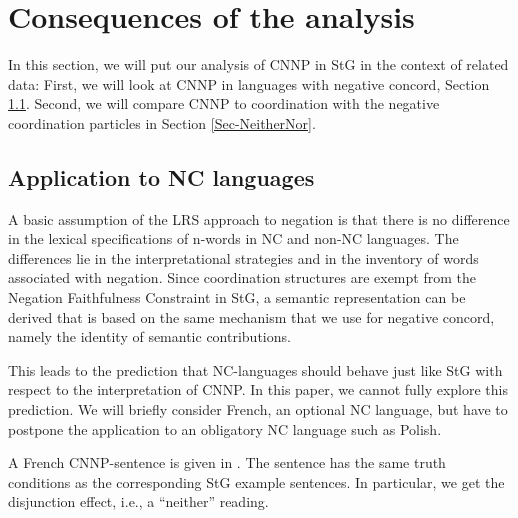 \documentclass[output=paper]{langsci/langscibook}
\begin{document}

\section{Consequences of the analysis}
\label{Sec-Analysis-Consequences}

In this section, we will put our analysis of CNNP in StG in the context of related data: First, we will look at CNNP in languages with negative concord, Section \ref{Sec-AnalysisOhterLang}. Second, we will compare CNNP to coordination with the negative coordination particles  in Section \ref{Sec-NeitherNor}.

\subsection{Application to NC languages}
\label{Sec-AnalysisOhterLang}



A basic assumption of the LRS approach to negation is that there is no difference in the lexical specifications of n-words in NC and non-NC languages. 
The differences lie in the interpretational strategies and in the inventory of words associated with negation. 
Since coordination structures are exempt from the Negation Faithfulness Constraint in StG, a semantic representation can be derived that is based on the same mechanism that we use for negative concord, namely the identity of semantic contributions.

This leads to the prediction that NC-languages should behave just like StG with respect to the interpretation of CNNP. 
In this paper, we cannot fully explore this prediction. 
We will briefly consider French, an optional NC language, but have to postpone the application to an obligatory NC language such as Polish.

A French CNNP-sentence is given in . The sentence has the same truth conditions as the corresponding StG example sentences.
In particular, we get the disjunction effect, i.e., a ``neither'' reading.
\end{document}
